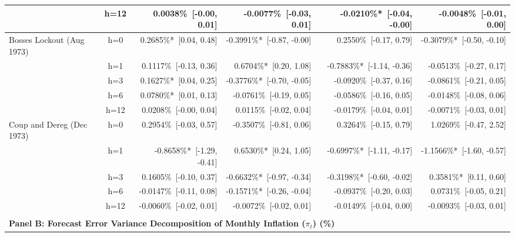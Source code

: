 \begin{table}[htbp]
{\begin{tabular}{@{}l c rrrr@{}}
 & h=12 & 0.0038\%~{\scriptsize [-0.00, 0.01]} & -0.0077\%~{\scriptsize [-0.03, 0.01]} & -0.0210\%*~{\scriptsize [-0.04, -0.00]} & -0.0048\%~{\scriptsize [-0.01, 0.00]} \\
\hline
Bosses Lockout (Aug 1973) & h=0 & 0.2685\%*~{\scriptsize [0.04, 0.48]} & -0.3991\%*~{\scriptsize [-0.87, -0.00]} & 0.2550\%~{\scriptsize [-0.17, 0.79]} & -0.3079\%*~{\scriptsize [-0.50, -0.10]} \\
 & h=1 & 0.1117\%~{\scriptsize [-0.13, 0.36]} & 0.6704\%*~{\scriptsize [0.20, 1.08]} & -0.7883\%*~{\scriptsize [-1.14, -0.36]} & -0.0513\%~{\scriptsize [-0.27, 0.17]} \\
 & h=3 & 0.1627\%*~{\scriptsize [0.04, 0.25]} & -0.3776\%*~{\scriptsize [-0.70, -0.05]} & -0.0920\%~{\scriptsize [-0.37, 0.16]} & -0.0861\%~{\scriptsize [-0.21, 0.05]} \\
 & h=6 & 0.0780\%*~{\scriptsize [0.01, 0.13]} & -0.0761\%~{\scriptsize [-0.19, 0.05]} & -0.0586\%~{\scriptsize [-0.16, 0.05]} & -0.0148\%~{\scriptsize [-0.08, 0.06]} \\
 & h=12 & 0.0208\%~{\scriptsize [-0.00, 0.04]} & 0.0115\%~{\scriptsize [-0.02, 0.04]} & -0.0179\%~{\scriptsize [-0.04, 0.01]} & -0.0071\%~{\scriptsize [-0.03, 0.01]} \\
\hline
Coup and Dereg (Dec 1973) & h=0 & 0.2954\%~{\scriptsize [-0.03, 0.57]} & -0.3507\%~{\scriptsize [-0.81, 0.06]} & 0.3264\%~{\scriptsize [-0.15, 0.79]} & 1.0269\%~{\scriptsize [-0.47, 2.52]} \\
 & h=1 & -0.8658\%*~{\scriptsize [-1.29, -0.41]} & 0.6530\%*~{\scriptsize [0.24, 1.05]} & -0.6997\%*~{\scriptsize [-1.11, -0.17]} & -1.1566\%*~{\scriptsize [-1.60, -0.57]} \\
 & h=3 & 0.1605\%~{\scriptsize [-0.10, 0.37]} & -0.6632\%*~{\scriptsize [-0.97, -0.34]} & -0.3198\%*~{\scriptsize [-0.60, -0.02]} & 0.3581\%*~{\scriptsize [0.11, 0.60]} \\
 & h=6 & -0.0147\%~{\scriptsize [-0.11, 0.08]} & -0.1571\%*~{\scriptsize [-0.26, -0.04]} & -0.0937\%~{\scriptsize [-0.20, 0.03]} & 0.0731\%~{\scriptsize [-0.05, 0.21]} \\
 & h=12 & -0.0060\%~{\scriptsize [-0.02, 0.01]} & -0.0072\%~{\scriptsize [-0.02, 0.01]} & -0.0149\%~{\scriptsize [-0.04, 0.00]} & -0.0093\%~{\scriptsize [-0.03, 0.01]} \\
\hline
\\[-0.5em]
\multicolumn{6}{l}{\textbf{Panel B: Forecast Error Variance Decomposition of Monthly Inflation ($\pi_t$) (\%)}} \\[0.2em]

\end{tabular}}
\end{table}
